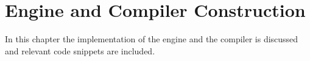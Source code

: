 \chapter{Engine and Compiler Construction}
In this chapter the implementation of the engine and the compiler is discussed and relevant code snippets are included.


%